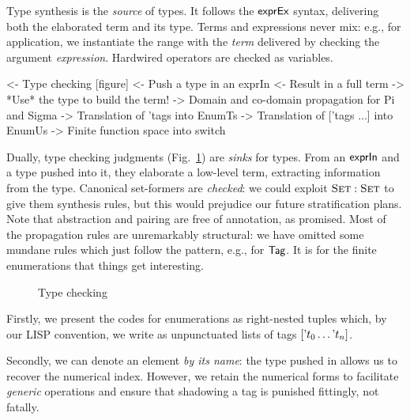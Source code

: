 Type synthesis is the \emph{source} of types. It follows the \(\textsf{exprEx}\)
syntax, delivering both the elaborated term and its type. Terms
and expressions never mix: e.g., for application, we
instantiate the range with the \emph{term} delivered by checking the
argument \emph{expression}. Hardwired operators are checked as variables.


%



\begin{wstructure}
<- Type checking [figure]
    <- Push a type in an exprIn
    <- Result in a full term
    -> *Use* the type to build the term!
        -> Domain and co-domain propagation for Pi and Sigma
        -> Translation of 'tags into EnumTs
        -> Translation of ['tags ...] into EnumUs
        -> Finite function space into switch
\end{wstructure}

Dually, type checking judgments
(Fig.~\ref{fig:type-checking}) are \emph{sinks} for types. From an
$\textsf{exprIn}$ and a type pushed into it, they elaborate a low-level
term, extracting information from the type.
Canonical set-formers are \emph{checked}: we could exploit \(\Set:\Set\)
to give them synthesis rules, but this would prejudice our future
stratification plans. Note that abstraction and pairing are free of
annotation, as promised. Most of the propagation rules are unremarkably
structural: we have omitted some mundane rules which just follow
the pattern, e.g., for \(\UId\). It is for the finite enumerations that
things get interesting.

\begin{figure}

\caption{Type checking}
\label{fig:type-checking}
\end{figure}

Firstly, we present the codes for enumerations as right-nested tuples
which, by our LISP convention, we write as unpunctuated lists of tags
\(\sqr{\etag{t_0}\ldots\etag{t_n}}\).

Secondly, we can denote an element \emph{by its
name}: the type pushed in allows us to recover the numerical
index. However, we retain the numerical forms to facilitate
\emph{generic} operations and ensure that shadowing a tag is punished
fittingly, not fatally.

